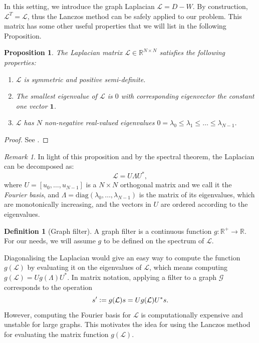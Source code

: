 \documentclass[11pt]{article}
\renewcommand{\mathbb}[1]{\mathds{#1}}
\newcommand{\R}{\mathbb{R}}
\newcommand{\G}{\mathcal{G}}
\renewcommand{\L}{\mathcal{L}}
\newcommand{\defeq}{\vcentcolon=}
\newtheorem{proposition}[theorem]{Proposition}
\theoremstyle{definition}
\newtheorem{definition}[theorem]{Definition}
\theoremstyle{remark}
\newtheorem{remark}[theorem]{Remark}
\theoremstyle{experimental}
\begin{document}
In this setting, we introduce the graph Laplacian $ \L = D - W$. By
construction, $\L^T = \mathcal{L}$, thus the Lanczos method can be safely applied to our 
problem. This matrix has some other useful properties that we will list in the following Proposition.
\begin{proposition}
  The Laplacian matrix $ \L \in \R^{N\times N} $ satisfies the following properties:
  \begin{enumerate}
    \item $ \L $ is symmetric and positive semi-definite.
    \item The smallest eigenvalue of $ \L $ is $ 0 $ with corresponding eigenvector the constant one
      vector $ \mathbf{1} $.
    \item $ \L $ has $ N $ non-negative real-valued eigenvalues $ 0 = \lambda_0 \le \lambda_1 \le
      \ldots \le \lambda_{N-1}$.
  \end{enumerate}
\end{proposition}
\begin{proof}
  See \cite{von2007tutorial}.
\end{proof}


\begin{remark}
  In light of this proposition and by the spectral theorem, the Laplacian can be decomposed as:
  \begin{equation*}
    \L = U \Lambda U^{*},
  \end{equation*}
  where $ U = \left[ u_0,\dots,u_{N-1} \right]$ is a $ N\times N $ orthogonal matrix and we call it
  the \emph{Fourier basis}, and $ \Lambda =
  \text{diag}\left(\lambda_0, \dots, \lambda_{N-1}\right)$ is the matrix of its eigenvalues, which
  are monotonically increasing, and the vectors in $ U $ are ordered according to the eigenvalues.
  \end{remark}

\begin{definition}[Graph filter]
  A graph filter is a continuous function $ g : \R^+ \to \R $. For our needs, we will assume $ g $ to be defined on the spectrum of $ \L $.
\end{definition}
Diagonalising the Laplacian would give an easy way to compute the function $ g(\L) $ by
evaluating it on the eigenvalues of $ \L $, which means computing $ g(\L) = U g(\Lambda) U^{*} $.
In matrix notation, applying a filter to a graph $ \G $ corresponds to the operation
\begin{equation*}
  s^\prime \defeq g(\L)s = U g(\L) U^{*}s.
\end{equation*}
However, computing the Fourier basis for $ \L $ is computationally expensive and unstable for large
graphs. This motivates the idea for using the Lanczos method for evaluating the matrix function $ g(\L)$.
\end{document}
